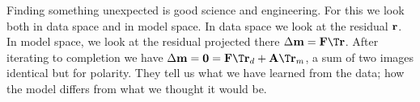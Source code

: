 \par
Finding something unexpected is good science and engineering.
For this we look both in data space and in model space.
In data space we look at the residual $\bold r$.
In model space, we look at the residual projected there
$\Delta \bold m =\bold F\T\bold r$.
After iterating to completion we have
$\Delta \bold m = \bold 0 = \bold F\T \bold r_d + \bold A\T\bold r_m$,
a sum of two images identical but for polarity.
They tell us what we have learned from the data;
how the model differs from what we thought it would be.

\begin{comment}
\par
Two fitting goals (\ref{eqn:invintwish}) are so common in practice
that it is convenient to adopt our least-square fitting
subroutine \texttt{solver-smp} \vpageref{lst:solver-smp} accordingly.
The modification
is shown in module \texttt{solver-reg} \vpageref{lst:solver-reg}.
In addition to specifying the ``data fitting'' operator $\bold F$
(parameter \texttt{Fop}),
we need to pass the ``model regularization'' operator $\bold A$
(parameter \texttt{Aop}) and the
size of its output (parameter \texttt{nAop}) for proper memory allocation.

\par
(When I first looked at module \texttt{solver-reg} I was appalled
by the many lines of code, especially all the declarations.
Then I realized how much much worse was Fortran 77 where
I needed to write a new solver for every pair of operators.
This one solver module works for all operator pairs
and for many optimization descent strategies
because these ``objects'' are arguments.
These more powerful objects require declarations that are more complicated
than the simple objects of Fortran 77.
As an author I have a dilemma:
To make algorithms compact (and seem simple) requires many careful definitions.
When these definitions put in the code, they are careful,
but the code becomes annoyingly verbose.
Otherwise, the definitions must go in the surrounding natural language
where they are not easily made precise.)


\moddex{solver-reg}{generic solver with regularization}
\end{comment}

